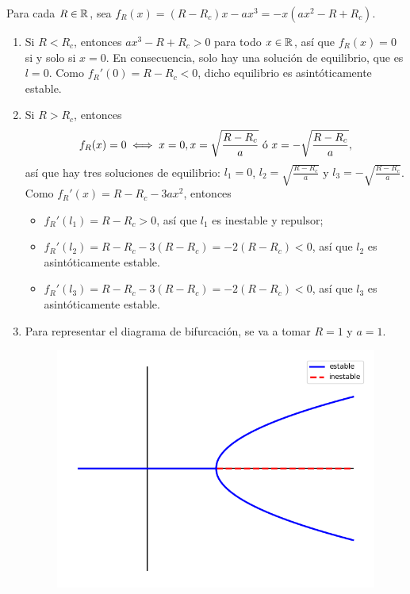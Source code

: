 \documentclass[11pt]{report}
\begin{document}
\begin{solution}
    Para cada $R\in\mathbb R$, sea $f_R(x) = (R-R_c)x-a x^3 = -x(ax^2-R+R_c)$.
    \begin{enumerate}
        \item Si $R<R_c$, entonces $ax^3-R+R_c >0$ para todo $x\in\mathbb R$, así que $f_R(x) = 0$ si y solo si $x = 0$. En consecuencia, solo hay una solución de equilibrio, que es $l = 0$. Como $f_R'(0) = R-R_c <0$, dicho equilibrio es asintóticamente estable.
        \item Si $R > R_c$, entonces
        \[f_R(x) = 0 \iff x = 0, x = \sqrt{\frac{R-R_c}{a}} \textup{ ó } x = -\sqrt{\frac{R-R_c}{a}},\]
        así que hay tres soluciones de equilibrio: $l_1 = 0$, $l_2 = \sqrt{\frac{R-R_c}{a}} $ y $l_3 = -\sqrt{\frac{R-R_c}{a}}$. Como $f_R'(x) = R-R_c-3ax^2$, entonces
        \begin{itemize}
            \item $f_R'(l_1) = R-R_c > 0$, así que $l_1$ es inestable y repulsor;
            \item $f_R'(l_2) = R-R_c-3(R-R_c) = -2(R-R_c) < 0$, así que $l_2$ es asintóticamente estable.
            \item $f_R'(l_3) = R-R_c-3(R-R_c) = -2(R-R_c) < 0$, así que $l_3$ es asintóticamente estable.
        \end{itemize}
        \item Para representar el diagrama de bifurcación, se va a tomar $R = 1$  y $a = 1$.
    \begin{figure}[H]
        \centering
        \includegraphics[scale=0.5]{img/4.png}
    \end{figure}
    \end{enumerate}
\end{solution}
\end{document}
